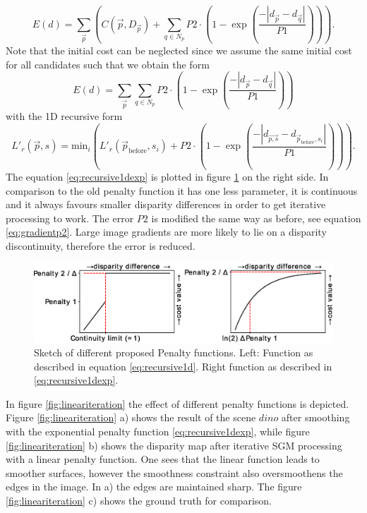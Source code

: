\documentclass  [
  paper    = a4,
  BCOR     = 10mm,
  twoside,
  fontsize = 12pt,
  fleqn,
  toc      = bibnumbered,
  toc      = listofnumbered,
  numbers  = noendperiod,
  headings = normal,
  listof   = leveldown,
  version  = 3.03
]                                       {scrreprt}
\begin{document}
\begin{equation}\label{eq:global_sgm_function}
E(d) = \sum_{\vec p} \left(C(\vec{p}, D_{\vec p}) + \sum_{q\in N_p} 
P2\cdot \left(1- \exp\left(\frac{-|d_{\vec{p}} - d_{\vec{q}}|}{P1}\right)\right)
\right).
\end{equation}
Note that the initial cost can be neglected since we assume the same initial cost for all candidates such that we obtain the form
\begin{equation}\label{eq:global_sgm_function_wo}
E(d) = \sum_{\vec p}\sum_{q\in N_p} 
P2\cdot \left(1- \exp\left(\frac{-|d_{\vec{p}} - d_{\vec{q}}|}{P1}\right)\right)
\end{equation}
with the 1D recursive form
\begin{equation}\label{eq:recursive1dexp}
L'_r(\vec{p}, s) = \text{min}_i\left( L'_r(\vec{p}_\text{before}, s_i) + P2\cdot \left(1- \exp\left(\frac{-|d_{\vec{p,s}} - d_{\vec{p}_\text{before}, s_i}|}{P1}\right)\right)\right).
\end{equation}
The equation \ref{eq:recursive1dexp} is plotted in figure \ref{fig:penaltyfunction} on the right side. In comparison to the old penalty function it has one less parameter, it is continuous and it always favours smaller disparity differences in order to get iterative processing to work. The error $P2$ is modified the same way as before, see equation \ref{eq:gradientp2}. Large image gradients are more likely to lie on a disparity discontinuity, therefore the error is reduced.
\begin{figure}[h!]
	\centering
	\includegraphics[width=1\linewidth]{images/penalty_function}
	\caption[Iterative SGM: Penalty function]{Sketch of different proposed Penalty functions. Left: Function as described in equation \ref{eq:recursive1d}. Right function as described in \ref{eq:recursive1dexp}.}
	\label{fig:penaltyfunction}
\end{figure}
In figure \ref{fig:lineariteration} the effect of different penalty functions is depicted. Figure \ref{fig:lineariteration} a) shows the result of the scene $dino$ after smoothing with the exponential penalty function \ref{eq:recursive1dexp}, while figure \ref{fig:lineariteration} b) shows the disparity map after iterative SGM processing with a linear penalty function. One sees that the linear function leads to smoother surfaces, however the smoothness constraint also oversmoothens the edges in the image. In a) the edges are maintained sharp. The figure \ref{fig:lineariteration} c) shows the ground truth for comparison. 
\end{document}
